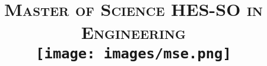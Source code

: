 \usepackage{fancyhdr}

\pagestyle{fancy}

\lhead{\small\assignmentTitle\ }
\lfoot{}
\rfoot{}

\renewcommand\headrulewidth{0.5pt}


\usepackage{titlesec}

\titleformat{\section}{\Large\bfseries}{\thesection}{6pt}{}


\author{\textbf{\assignmentAuthorName}} %
\date{} %

\title{
    \textsc{\LARGE Master of Science HES-SO in Engineering}\\[1.5cm] %
    \texttt{[image: images/mse.png]}\\
    \thispagestyle{empty} %
    \vspace{0.1\textheight} %
    \textbf{\assignmentTitle}\\[4pt]
    \ifdef{\assignmentDueDate}{{\assignmentDueDate}\\}{} %
    \ifdef{\assignmentClassInstructor}{{\large \textit{\assignmentClassInstructor}}}{} %
    \vspace{0.32\textheight} %
}

